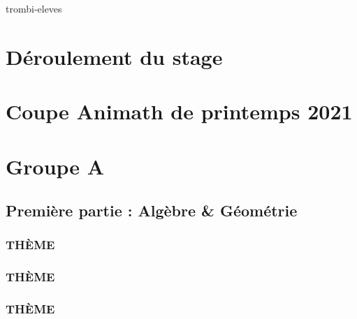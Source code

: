 \documentclass[poly,trombi]{valbonne}
\begin{document}

\pagestyle{plain}

\footnotesize
\pagestyle{trombi}
\newpage
{trombi-eleves}


\normalsize


\pagestyle{empty}

\renewcommand{\headrulewidth}{0.4pt}

\tableofcontents

\chapter{Déroulement du stage}
\pagestyle {plain}



\chapter{Coupe Animath de printemps 2021}







\chapter{Groupe A}

\minitoc \clearpage

\section{Première partie : Algèbre \& Géométrie}

\subsection{THÈME}


\subsection{THÈME}


\subsection{THÈME}
\end{document}
